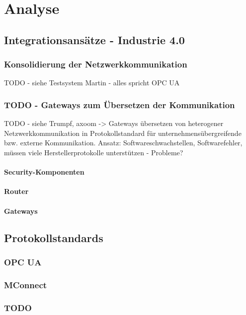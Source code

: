 \chapter{Analyse}

\section{Integrationsansätze - Industrie 4.0}
\subsection{Konsolidierung der Netzwerkkommunikation}

TODO - siehe Testsystem Martin - alles spricht OPC UA

\subsection{TODO - Gateways zum Übersetzen der Kommunikation}

TODO - siehe Trumpf, axoom -> Gateways übersetzen von heterogener Netzwerkkommunikation in Protokollstandard für unternehmensübergreifende bzw. externe Kommunikation.
Ansatz: Softwareschwachstellen, Softwarefehler, müssen viele Herstellerprotokolle unterstützen - Probleme?

\subsubsection{Security-Komponenten}
\subsubsection{Router}
\subsubsection{Gateways}

\section{Protokollstandards}
\subsection{OPC UA}
\subsection{MConnect}
\subsection{TODO}

